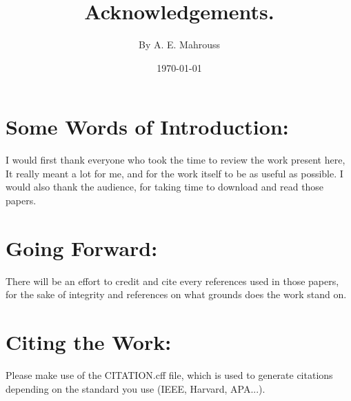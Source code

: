 \documentclass[10pt]{article}
\title{%
	\vspace{-1.5em}%
	\large\textbf{Acknowledgements.}%
}
\author{By A. E. Mahrouss}
\date{\today}
\theoremstyle{plain}
\theoremstyle{definition}
\theoremstyle{remark}
\begin{document}

\maketitle

\section{Some Words of Introduction:}

I would first thank everyone who took the time to review the work present here, It really meant a lot for me, and for the work itself to be as useful as possible. I would also thank the audience, for taking time to download and read those papers.

\section{Going Forward:}

There will be an effort to credit and cite every references used in those papers, for the sake of integrity and references on what grounds does the work stand on.

\section{Citing the Work:}

Please make use of the CITATION.cff file, which is used to generate citations depending on the standard you use (IEEE, Harvard, APA...).

\end{document}
